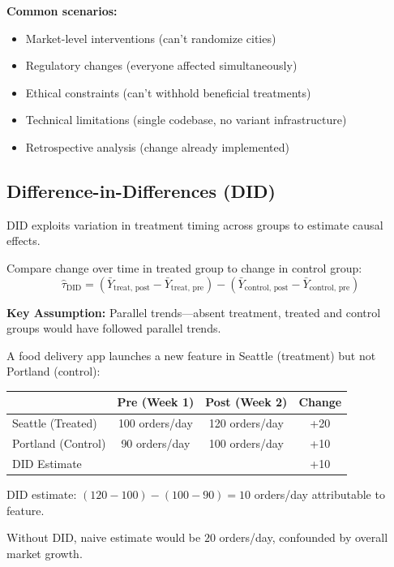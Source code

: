 \textbf{Common scenarios:}
\begin{itemize}
    \item Market-level interventions (can't randomize cities)
    \item Regulatory changes (everyone affected simultaneously)
    \item Ethical constraints (can't withhold beneficial treatments)
    \item Technical limitations (single codebase, no variant infrastructure)
    \item Retrospective analysis (change already implemented)
\end{itemize}

\subsection{Difference-in-Differences (DID)}

DID exploits variation in treatment timing across groups to estimate causal effects.

\begin{definition}
Compare change over time in treated group to change in control group:
\begin{equation}
\hat{\tau}_{\text{DID}} = (\bar{Y}_{\text{treat, post}} - \bar{Y}_{\text{treat, pre}}) - (\bar{Y}_{\text{control, post}} - \bar{Y}_{\text{control, pre}})
\end{equation}
\end{definition}

\textbf{Key Assumption:} Parallel trends—absent treatment, treated and control groups would have followed parallel trends.

\begin{example}
A food delivery app launches a new feature in Seattle (treatment) but not Portland (control):

\begin{center}
\begin{tabular}{lccc}
\toprule
& \textbf{Pre (Week 1)} & \textbf{Post (Week 2)} & \textbf{Change} \\
\midrule
Seattle (Treated) & 100 orders/day & 120 orders/day & +20 \\
Portland (Control) & 90 orders/day & 100 orders/day & +10 \\
\midrule
DID Estimate & & & +10 \\
\bottomrule
\end{tabular}
\end{center}

DID estimate: $(120 - 100) - (100 - 90) = 10$ orders/day attributable to feature.

Without DID, naive estimate would be $20$ orders/day, confounded by overall market growth.
\end{example}

